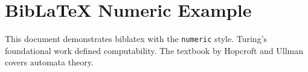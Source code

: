 \documentclass[11pt]{article}
\begin{document}
\section*{BibLaTeX Numeric Example}

This document demonstrates biblatex with the \texttt{numeric} style.
Turing's foundational work \cite{turing1936} defined computability.
The textbook by Hopcroft and Ullman \cite{hopcroft1979} covers automata theory.

\printbibliography
\end{document}
